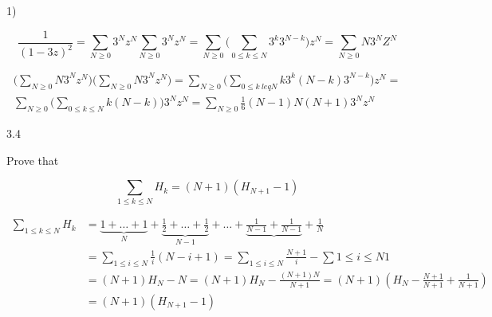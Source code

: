 \documentclass[12pt]{article}
\begin{document}
1)

\begin{equation}
    \frac{1}{(1-3z)^2} = \sum_{N \geq 0}3^Nz^N \sum_{N \geq 0}3^Nz^N = \sum_{N \geq 0} \bigg( \sum_{0 \leq k \leq N}3^k3^{N-k} \bigg) z^N = \sum_{N \geq 0}N3^NZ^N \nonumber
\end{equation}

\begin{equation}
\begin{split}
    \bigg(\sum_{N \geq 0}N3^Nz^N\bigg)\bigg(\sum_{N \geq 0}N3^Nz^N\bigg) = \sum_{N \geq 0} \bigg( \sum_{0 \leq k \ leq N}k3^k(N-k)3^{N-k} \bigg)z^N =\\
    \sum_{N \geq 0} \bigg( \sum_{0 \leq k \leq N}k(N - k) \bigg)3^Nz^N = \sum_{N \geq 0} \frac{1}{6}(N-1)N(N+1)3^Nz^N \nonumber
\end{split}
\end{equation}

3.4

Prove that

\begin{equation}
\sum_{1 \leq k \leq N} H_k = (N + 1)(H_{N + 1} - 1) \nonumber
\end{equation}

\begin{equation}
\begin{split}
\sum_{1 \leq k \leq N} H_k & = \underbrace{1 + \dots + 1}_{N} + \underbrace{\frac{1}{2} + \dots + \frac{1}{2}}_{N - 1} + \dots + \underbrace{\frac{1}{N-1} + \frac{1}{N-1}} + \frac{1}{N} \\
                           & = \sum_{1 \leq i \leq N}\frac{1}{i}(N - i + 1) = \sum_{1 \leq i \leq N}\frac{N+1}{i} - \sum{1 \leq i \leq N}1\\
                           & = (N + 1)H_N - N = (N + 1)H_N - \frac{(N + 1)N}{N + 1} = (N + 1)(H_N - \frac{N+1}{N+1} + \frac{1}{N+1})\\
                           & = (N + 1)(H_{N+1} - 1)\nonumber
\end{split}
\end{equation}
\end{document}
